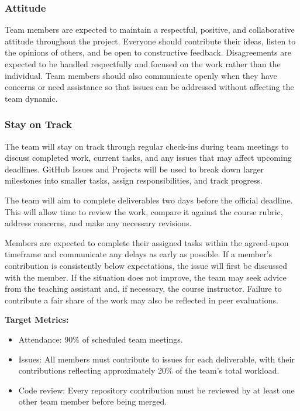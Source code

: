 \documentclass{article}
\begin{document}
\subsubsection*{Attitude}

Team members are expected to maintain a respectful, positive, and collaborative attitude throughout the project. 
Everyone should contribute their ideas, listen to the opinions of others, and be open to constructive feedback.
Disagreements are expected to be handled respectfully and focused on the work rather than the individual.
Team members should also communicate openly when they have concerns or need assistance so that issues can
be addressed without affecting the team dynamic.

\subsubsection*{Stay on Track}

The team will stay on track through regular check-ins during team meetings to discuss completed work,
current tasks, and any issues that may affect upcoming deadlines. GitHub Issues and Projects will be
used to break down larger milestones into smaller tasks, assign responsibilities, and track progress.

The team will aim to complete deliverables two days before the official deadline. This will allow time
to review the work, compare it against the course rubric, address concerns, and make any necessary revisions.

Members are expected to complete their assigned tasks within the agreed-upon timeframe and communicate
any delays as early as possible. If a member's contribution is consistently below expectations,
the issue will first be discussed with the member. If the situation does not improve, the team
may seek advice from the teaching assistant and, if necessary, the course instructor. Failure
to contribute a fair share of the work may also be reflected in peer evaluations.

\textbf{Target Metrics:}
\begin{itemize}
  \item Attendance: 90\% of scheduled team meetings.
  \item Issues: All members must contribute to issues for each deliverable, with
  their contributions reflecting approximately 20\% of the team's total workload.
  \item Code review: Every repository contribution must be reviewed by at least one other team member before being merged.
\end{itemize}
\end{document}
